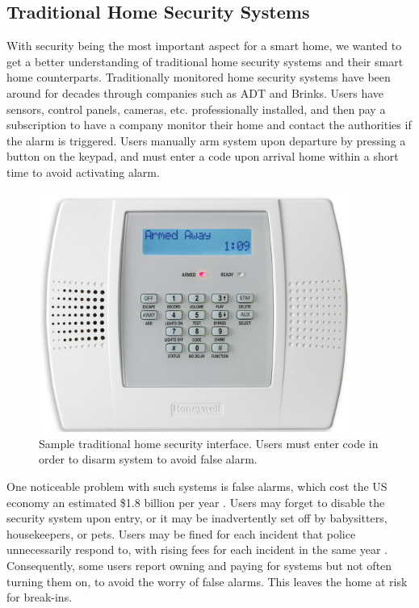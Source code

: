 \subsection{Traditional Home Security Systems}

With security being the most important aspect for a smart home, we wanted to get a better understanding of traditional home security systems and their smart home counterparts. Traditionally monitored home security systems have been around for decades through companies such as ADT and Brinks. Users have sensors, control panels, cameras, etc. professionally installed, and then pay a subscription to have a company monitor their home and contact the authorities if the alarm is triggered. Users manually arm system upon departure by pressing a button on the keypad, and must enter a code upon arrival home within a short time to avoid activating alarm. 

\begin{figure}[ht]
\centering
	\includegraphics[keepaspectratio, width=4in]{Figures/Benchmarking/keypad.jpg}
	\caption{Sample traditional home security interface. Users must enter code in order to disarm system to avoid false alarm. \protect\footnotemark}
	\label{fig:keypad.jpg}
\end{figure}


One noticeable problem with such systems is false alarms, which cost the US economy an estimated \$1.8 billion per year \cite{Blackstone2007}. Users may forget to disable the security system upon entry, or it may be inadvertently set off by babysitters, housekeepers, or pets. Users may be fined for each incident that police unnecessarily respond to, with rising fees for each incident in the same year \cite{Blackstone2007}. Consequently, some users report owning and paying for systems but not often turning them on, to avoid the worry of false alarms. This leaves the home at risk for break-ins.


